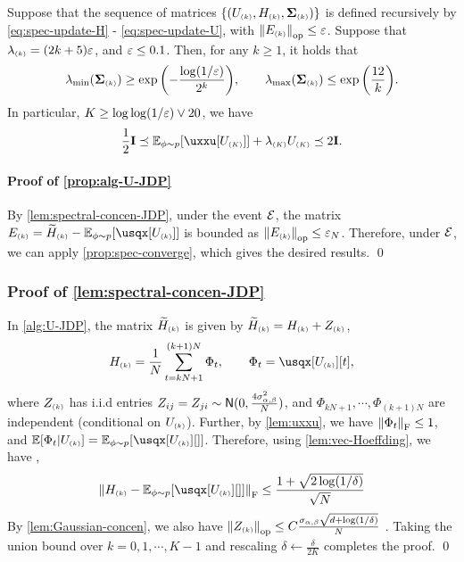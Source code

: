 \begin{proposition}\label{prop:spec-converge}
Suppose that the sequence of matrices $\left\{ (U_{\scriptscriptstyle{ (k) }}, H_{\scriptscriptstyle{ (k) }}, \boldsymbol{\Sigma}_{\scriptscriptstyle{ (k) }}) \right\}$ is defined recursively by \eqref{eq:spec-update-H} - \cref{eq:spec-update-U}, with $\left\|E_{\scriptscriptstyle{ (k) }}\right\|_{\rm op}\leq \varepsilon$. Suppose that $\lambda_{\scriptscriptstyle{ (k) }}=(2k+5)\varepsilon$, and $\varepsilon\leq 0.1$. Then, for any $k\geq 1$, it holds that
\begin{align*}
    \lambda_{\min}(\boldsymbol{\Sigma}_{\scriptscriptstyle{ (k) }}) \geq \exp{\left(  -\frac{\log(1/\varepsilon)}{2^{k}}  \right)}, \qquad \lambda_{\max}(\boldsymbol{\Sigma}_{\scriptscriptstyle{ (k) }})\leq \exp{\left(  \frac{12}{k}  \right)}.
\end{align*}
In particular, $K\geq \log\log(1/\varepsilon)\vee 20$, we have
\begin{align*}
    \frac12\id\preceq \Ep{ \uxxu[U\kc] }+\lambda\kc U\kc \preceq 2\id.
\end{align*}
\end{proposition}

\paragraph{Proof of \cref{prop:alg-U-JDP}}
By \cref{lem:spectral-concen-JDP}, under the event $\mathcal{E}$, the matrix $E\kk=\til H\kk -\Ep{ \usqx[U\kk] }$ is bounded as $\left\|E_{\scriptscriptstyle{ (k) }}\right\|_{\rm op}\leq \varepsilon_N$. 
Therefore, under $\mathcal{E}$, we can apply \cref{prop:spec-converge}, which gives the desired results.
\qed



\subsubsection{Proof of \cref{lem:spectral-concen-JDP}}
In \cref{alg:U-JDP}, the matrix $\widetilde H_{\scriptscriptstyle{ (k) }}$ is given by $\widetilde H_{\scriptscriptstyle{ (k) }}=H_{\scriptscriptstyle{ (k) }}+Z_{\scriptscriptstyle{ (k) }}$,
\begin{align*}
    H\kk=\frac1N\sumkn \Phi_t, \qquad \Phi_t=\usqx[U\kk][t],
\end{align*}
where $Z_{\scriptscriptstyle{ (k) }}$ has i.i.d entries $Z_{ij}=Z_{ji}\sim \mathsf{N}(0,\frac{4\sigma_{\alpha,\beta}^2}{N})$, and $\Phi_{kN+1},\cdots, \Phi_{(k+1)N}$ are independent (conditional on $U_{\scriptscriptstyle{ (k) }}$). Further, by \cref{lem:uxxu}, we have $\left\|\Phi_t\right\|_{\mathrm{F}}\leq 1$, and $\EE[\Phi_t|U\kk]=\Ep{\usqx[U\kk][]}$. Therefore, using \cref{lem:vec-Hoeffding}, we have \whp,
\begin{align*}
    \nrmF{H\kk-\Ep{\usqx[U\kk][]}}\leq \frac{1+\sqrt{2\log(1/\delta)}}{\sqrt{N}}
\end{align*}
By \cref{lem:Gaussian-concen}, we also have $\left\|Z_{\scriptscriptstyle{ (k) }}\right\|_{\rm op}\leq C\frac{\sigma_{\alpha,\beta}\sqrt{d+\log(1/\delta)}}{N}$ \whp. Taking the union bound over $k=0,1,\cdots,K-1$ and rescaling $\delta\leftarrow \frac{\delta}{2K}$ completes the proof.
\qed


